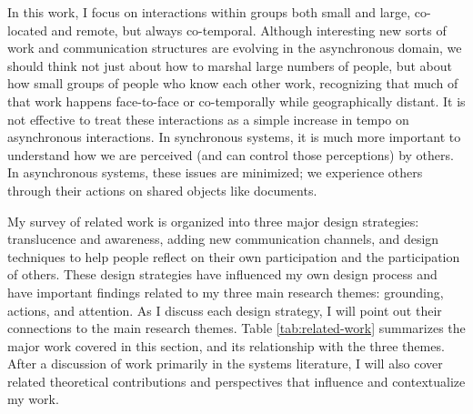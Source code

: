 In this work, I focus on interactions within groups both small and large, co-located and remote, but always co-temporal. Although interesting new sorts of work and communication structures are evolving in the asynchronous domain, we should think not just about how to marshal large numbers of people, but about how small groups of people who know each other work, recognizing that much of that work happens face-to-face or co-temporally while geographically distant. It is not effective to treat these interactions as a simple increase in tempo on asynchronous interactions. In synchronous systems, it is much more important to understand how we are perceived (and can control those perceptions) by others. In asynchronous systems, these issues are minimized; we experience others through their actions on shared objects like documents. 


My survey of related work is organized into three major design strategies: translucence and awareness, adding new communication channels, and design techniques to help people reflect on their own participation and the participation of others. These design strategies have influenced my own design process and have important findings related to my three main research themes: grounding, actions, and attention. As I discuss each design strategy, I will point out their connections to the main research themes. Table \ref{tab:related-work} summarizes the major work covered in this section, and its relationship with the three themes. After a discussion of work primarily in the systems literature, I will also cover related theoretical contributions and perspectives that influence and contextualize my work.








